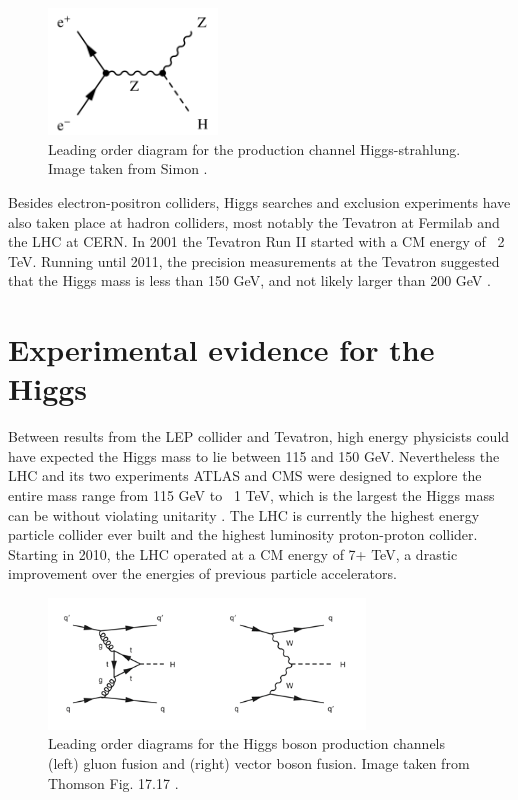 \begin{figure}
  \centering
  \includegraphics[width=0.40\textwidth,height=0.40\textheight,keepaspectratio]
                {pictures/higgsstrahlung.png}
  \caption{Leading order diagram for the production channel Higgs-strahlung. 
           Image taken from Simon \cite{simon_prospects_2013}.}
  \label{fig:higgsstrahlung}
\end{figure}

Besides electron-positron colliders, Higgs searches and exclusion experiments
have also taken place at hadron colliders, most notably the Tevatron at
Fermilab and the LHC at CERN. In 2001 the Tevatron Run II started with a CM 
energy of ~2 TeV. Running until 2011, the precision measurements at the
Tevatron suggested that the Higgs mass is less than 150 GeV, and not likely
larger than 200 GeV \cite{thomson_modern_2013}.

\section{Experimental evidence for the Higgs}
Between results from the LEP collider and Tevatron, high energy physicists
could have expected the Higgs mass to lie between 115 and 150 GeV. Nevertheless
the LHC and its two experiments ATLAS and CMS were designed to explore the
entire mass range from 115 GeV to ~1 TeV, which is the largest the Higgs mass
can be without violating unitarity \cite{dittmaier_higgs_2013}. The LHC is currently
the highest energy particle collider ever built and the highest luminosity 
proton-proton collider. Starting in 2010, the LHC operated at a CM energy of 7+
TeV, a drastic improvement over the energies of previous particle accelerators.
\begin{figure}
  \centering
  \includegraphics[width=0.75\textwidth,height=0.75\textheight,keepaspectratio]
                {pictures/higgs_prod_hadrons.png}
  \caption{Leading order diagrams for the Higgs boson production channels
           (left) gluon fusion and (right) vector boson fusion. Image taken 
           from Thomson Fig. 17.17 \cite{thomson_modern_2013}.}
  \label{fig:higgsfusion} 
\end{figure}

